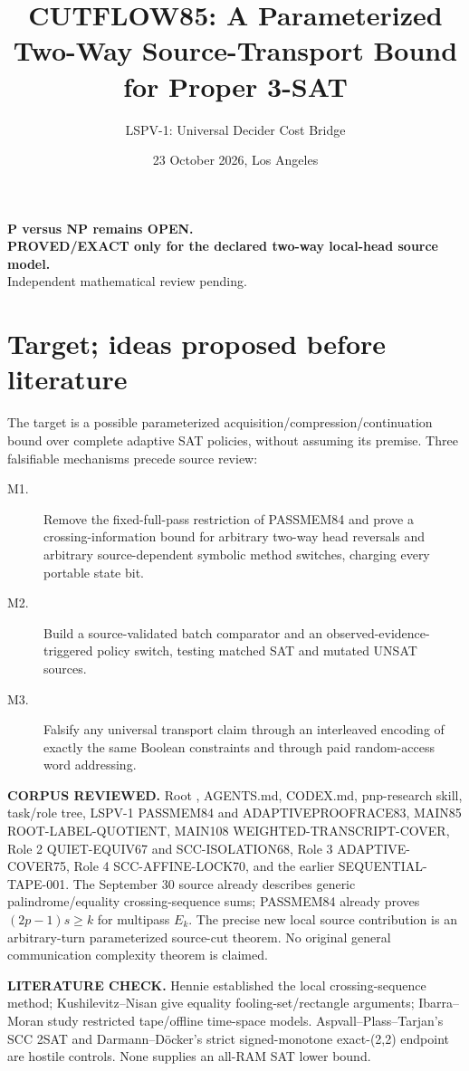 \documentclass[11pt]{article}
\title{CUTFLOW85: A Parameterized Two-Way Source-Transport Bound for Proper 3-SAT}
\author{LSPV-1: Universal Decider Cost Bridge}
\date{23 October 2026, Los Angeles}
\begin{document}
\maketitle
\begin{center}
\textbf{P versus NP remains OPEN.}\\
\textbf{PROVED/EXACT only for the declared two-way local-head source model.}\\
Independent mathematical review pending.
\end{center}
\section{Target; ideas proposed before literature}
The target is a possible parameterized acquisition/compression/continuation bound over complete adaptive SAT policies, without assuming its premise. Three falsifiable mechanisms precede source review:
\begin{description}
\item[M1.] Remove the fixed-full-pass restriction of PASSMEM84 and prove a crossing-information bound for arbitrary two-way head reversals and arbitrary source-dependent symbolic method switches, charging every portable state bit.
\item[M2.] Build a source-validated batch comparator and an observed-evidence-triggered policy switch, testing matched SAT and mutated UNSAT sources.
\item[M3.] Falsify any universal transport claim through an interleaved encoding of exactly the same Boolean constraints and through paid random-access word addressing.
\end{description}
\noindent\textbf{CORPUS REVIEWED.} Root , AGENTS.md, CODEX.md, pnp-research skill, task/role tree, LSPV-1 PASSMEM84 and ADAPTIVEPROOFRACE83, MAIN85 ROOT-LABEL-QUOTIENT, MAIN108 WEIGHTED-TRANSCRIPT-COVER, Role 2 QUIET-EQUIV67 and SCC-ISOLATION68, Role 3 ADAPTIVE-COVER75, Role 4 SCC-AFFINE-LOCK70, and the earlier SEQUENTIAL-TAPE-001. The September 30 source already describes generic palindrome/equality crossing-sequence sums; PASSMEM84 already proves $(2p-1)s\ge k$ for multipass $E_k$. The precise new local source contribution is an arbitrary-turn parameterized source-cut theorem. No original general communication complexity theorem is claimed.

\noindent\textbf{LITERATURE CHECK.} Hennie established the local crossing-sequence method; Kushilevitz--Nisan give equality fooling-set/rectangle arguments; Ibarra--Moran study restricted tape/offline time-space models. Aspvall--Plass--Tarjan's SCC 2SAT and Darmann--D\"ocker's strict signed-monotone exact-(2,2) endpoint are hostile controls. None supplies an all-RAM SAT lower bound.
\end{document}
